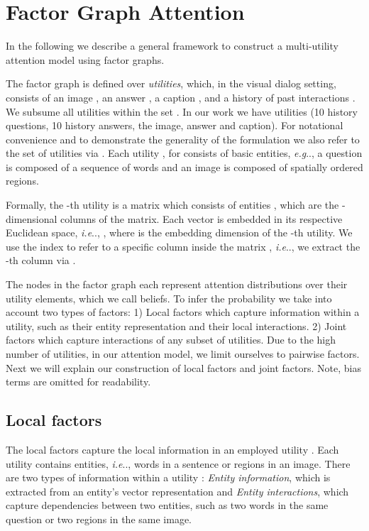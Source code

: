 \documentclass[10pt,twocolumn,letterpaper]{article}
\makeatletter
\def\@onedot{\ifx\@let@token.\else.\null\fi\xspace}
\DeclareRobustCommand\onedot{\futurelet\@let@token\@onedot}
\def\eg{\emph{e.g}\onedot} \def\Eg{\emph{E.g}\onedot}
\def\ie{\emph{i.e}\onedot} \def\Ie{\emph{I.e}\onedot}
\makeatother
\begin{document}
\section{Factor Graph Attention}
\label{sec:FGA}
In the following we describe a general framework to construct a multi-utility attention model using factor graphs. 

The factor graph is defined over \textit{utilities}, which, in the visual dialog setting, consists of an image , an answer , a caption , and a history of past interactions . We subsume all utilities within the set . In our work we have  utilities (10 history questions, 10 history answers, the image, answer and caption). For notational convenience and to demonstrate the generality of the formulation we also refer to the set of utilities via  . Each utility , for  consists of basic entities, \eg, a question is composed of a sequence of words and an image is composed  of spatially ordered regions. 


Formally, the -th utility   is a  matrix which consists of  entities , which are the -dimensional columns of the matrix. Each vector  is embedded in its respective Euclidean space, \ie, , where  is the embedding dimension of the -th utility.  We use the index  to refer to a specific column inside the matrix , \ie, we extract the -th column via . 

The  nodes in the factor graph each represent attention distributions over their  utility  elements, which we call beliefs. To infer the probability we take into account two types of factors: 1) Local factors which capture information within a utility, such as their entity representation and their local interactions. 2) Joint factors which capture interactions of any subset of utilities. Due to the high number of utilities,  in our attention model, we limit ourselves to pairwise factors. Next we will explain our construction of local factors and joint factors. Note, bias terms are omitted for readability. 





\subsection{Local factors} 
\label{sec:local}
The local factors capture the local information in an employed utility . Each utility contains entities, \ie, words in a sentence or regions in an image. There are two types of information within a utility : \textit{Entity information}, which is extracted from an entity's vector representation  and \textit{Entity interactions}, which  capture dependencies between two entities, such as two words in the same question or two regions in the same image. 
\end{document}
